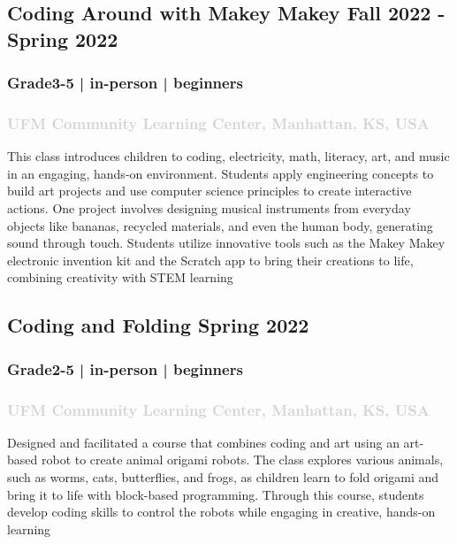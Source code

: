 \documentclass[11pt]{article}
\begin{document}
\label{sec: MakeyMakey1} 
\subsection{ Coding Around with Makey Makey \hfill  \normalfont  Fall 2022 - Spring 2022 } 
 \subsubsection{ Grade3-5 | in-person | beginners   }
  \subsubsection{ \textcolor{lightgray}{\normalfont UFM Community Learning Center, Manhattan, KS, USA   }}
 \vspace{0.2em} %
  \noindent This class introduces children to coding, electricity, math, literacy, art, and music in an engaging, hands-on environment. Students apply engineering concepts to build art projects and use computer science principles to create interactive actions. One project involves designing musical instruments from everyday objects like bananas, recycled materials, and even the human body, generating sound through touch. Students utilize innovative tools such as the Makey Makey electronic invention kit and the Scratch app to bring their creations to life, combining creativity with STEM learning
\vspace{0.8em} %

\label{sec: CodingFolding} 
\subsection{Coding and Folding \hfill  \normalfont  Spring 2022 } 
 \subsubsection{ Grade2-5 | in-person | beginners   }
  \subsubsection{ \textcolor{lightgray}{\normalfont UFM Community Learning Center, Manhattan, KS, USA   }}
 \vspace{0.2em} %
  \noindent Designed and facilitated a course that combines coding and art using an art-based robot to create animal origami robots. The class explores various animals, such as worms, cats, butterflies, and frogs, as children learn to fold origami and bring it to life with block-based programming. Through this course, students develop coding skills to control the robots while engaging in creative, hands-on learning
\vspace{0.8em} %
\end{document}
